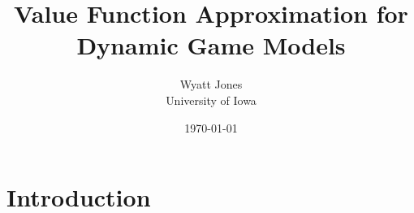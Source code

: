 \documentclass[12pt]{article}
\title{Value Function Approximation for Dynamic Game Models}
\author{Wyatt Jones\\University of Iowa}
\date{\today}
\begin{document}
\maketitle


\section{Introduction}
\label{intro}



\end{document}
